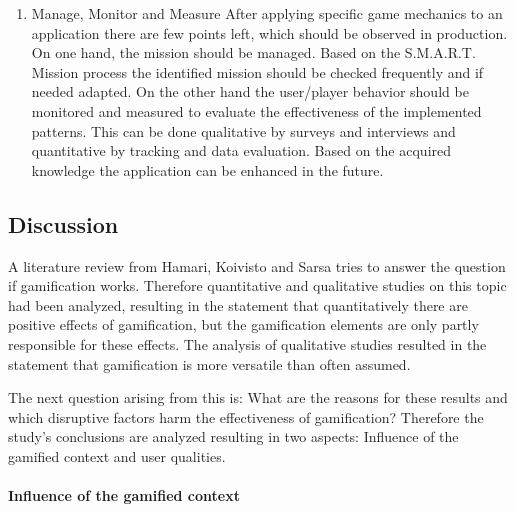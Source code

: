 \begin{enumerate}
	\item Manage, Monitor and Measure \newline
	After applying specific game mechanics to an application there are few points left, which should be observed in production. On one hand, the mission should be managed. Based on the S.M.A.R.T. Mission process the identified mission should be checked frequently and if needed adapted. On the other hand the user/player behavior should be monitored and measured to evaluate the effectiveness of the implemented patterns. This can be done qualitative by surveys and interviews and quantitative by tracking and data evaluation. Based on the acquired knowledge the application can be enhanced in the future.	\cite[p. 92-96]{kumarGamificationWorkDesigning2013}
\end{enumerate}

\newpage

\subsection{Discussion}
\label{sec:theoryBe}

A literature review from Hamari, Koivisto and Sarsa \cite{hamariDoesGamificationWork2014} tries to answer the question if gamification works. Therefore quantitative and qualitative studies on this topic had been analyzed, resulting in the statement that quantitatively there are positive effects of gamification, but the gamification elements are only partly responsible for these effects. The analysis of qualitative studies resulted in the statement that gamification is more versatile than often assumed. \cite[p. 3029, 3030]{hamariDoesGamificationWork2014} 

The next question arising from this is: What are the reasons for these results and which disruptive factors harm the effectiveness of gamification? Therefore the study's conclusions are analyzed resulting in two aspects: Influence of the gamified context and user qualities. \cite[p. 3029, 3030]{hamariDoesGamificationWork2014}

\paragraph*{Influence of the gamified context}

